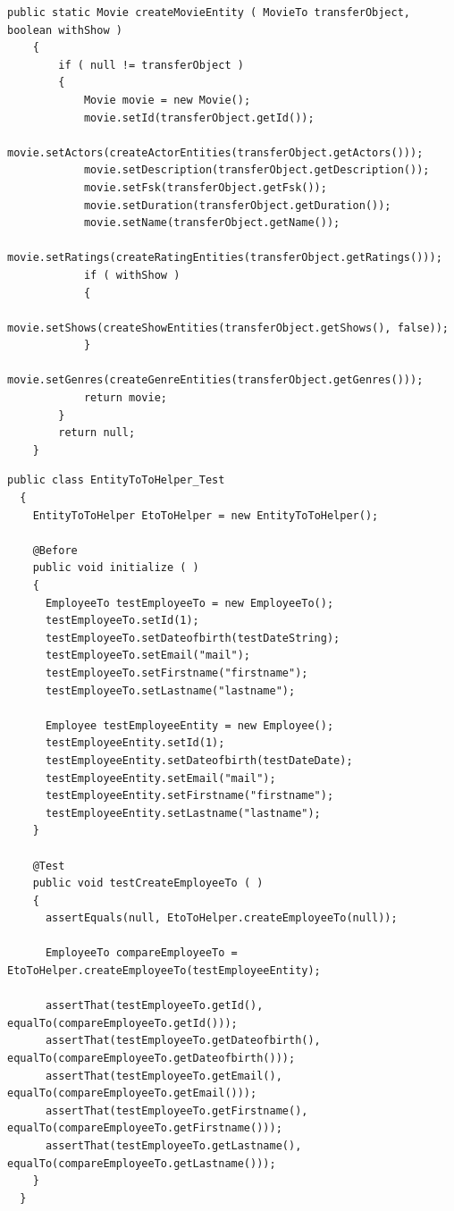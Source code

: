 \begin{minipage}{\linewidth}
	\begin{lstlisting}[style=lstJava]
	public static Movie createMovieEntity ( MovieTo transferObject, boolean withShow )
	{
		if ( null != transferObject )
		{
			Movie movie = new Movie();
			movie.setId(transferObject.getId());
			movie.setActors(createActorEntities(transferObject.getActors()));
			movie.setDescription(transferObject.getDescription());
			movie.setFsk(transferObject.getFsk());
			movie.setDuration(transferObject.getDuration());
			movie.setName(transferObject.getName());
			movie.setRatings(createRatingEntities(transferObject.getRatings()));
			if ( withShow )
			{
				movie.setShows(createShowEntities(transferObject.getShows(), false));
			}
			movie.setGenres(createGenreEntities(transferObject.getGenres()));
			return movie;
		}
		return null;
	}
	\end{lstlisting}
	\label{lst:ToToEntityHelper_movie}
\end{minipage}

\begin{minipage}{\linewidth}
  \begin{lstlisting}[style=lstJava]
  public class EntityToToHelper_Test
  {
    EntityToToHelper EtoToHelper = new EntityToToHelper();

    @Before
    public void initialize ( )
    {
      EmployeeTo testEmployeeTo = new EmployeeTo();
      testEmployeeTo.setId(1);
      testEmployeeTo.setDateofbirth(testDateString);
      testEmployeeTo.setEmail("mail");
      testEmployeeTo.setFirstname("firstname");
      testEmployeeTo.setLastname("lastname");

      Employee testEmployeeEntity = new Employee();
      testEmployeeEntity.setId(1);
      testEmployeeEntity.setDateofbirth(testDateDate);
      testEmployeeEntity.setEmail("mail");
      testEmployeeEntity.setFirstname("firstname");
      testEmployeeEntity.setLastname("lastname");
    }

    @Test
    public void testCreateEmployeeTo ( )
    {
      assertEquals(null, EtoToHelper.createEmployeeTo(null));

      EmployeeTo compareEmployeeTo = EtoToHelper.createEmployeeTo(testEmployeeEntity);

      assertThat(testEmployeeTo.getId(), equalTo(compareEmployeeTo.getId()));
      assertThat(testEmployeeTo.getDateofbirth(), equalTo(compareEmployeeTo.getDateofbirth()));
      assertThat(testEmployeeTo.getEmail(), equalTo(compareEmployeeTo.getEmail()));
      assertThat(testEmployeeTo.getFirstname(), equalTo(compareEmployeeTo.getFirstname()));
      assertThat(testEmployeeTo.getLastname(), equalTo(compareEmployeeTo.getLastname()));
    }
  }

	\end{lstlisting}
  \label{src:entitytotohelpertest}
\end{minipage}